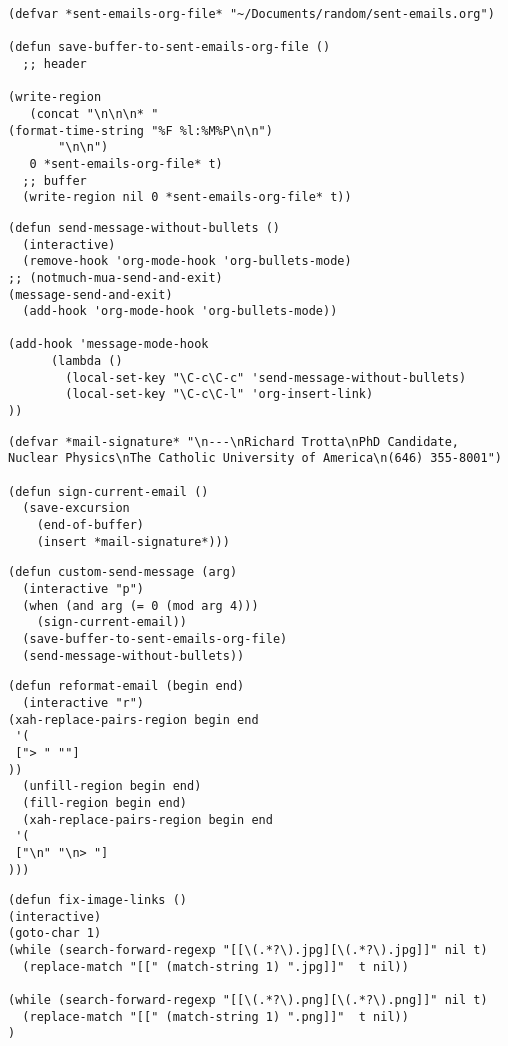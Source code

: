 \documentclass[11pt]{article}
\begin{document}
\label{sec:org41771ae}
\begin{verbatim}
(defvar *sent-emails-org-file* "~/Documents/random/sent-emails.org")

(defun save-buffer-to-sent-emails-org-file ()
  ;; header

(write-region
   (concat "\n\n\n* "
(format-time-string "%F %l:%M%P\n\n")
	   "\n\n")
   0 *sent-emails-org-file* t)
  ;; buffer
  (write-region nil 0 *sent-emails-org-file* t))
\end{verbatim}
\label{sec:orgef7c00f}
\begin{verbatim}
(defun send-message-without-bullets ()
  (interactive)
  (remove-hook 'org-mode-hook 'org-bullets-mode)
;; (notmuch-mua-send-and-exit)
(message-send-and-exit) 
  (add-hook 'org-mode-hook 'org-bullets-mode))

(add-hook 'message-mode-hook
	  (lambda ()
	    (local-set-key "\C-c\C-c" 'send-message-without-bullets)
	    (local-set-key "\C-c\C-l" 'org-insert-link)
))

\end{verbatim}
\label{sec:orgb50f745}
\begin{verbatim}
(defvar *mail-signature* "\n---\nRichard Trotta\nPhD Candidate, Nuclear Physics\nThe Catholic University of America\n(646) 355-8001")

(defun sign-current-email ()
  (save-excursion
    (end-of-buffer)
    (insert *mail-signature*)))
\end{verbatim}

\label{sec:orgf3c4121}
\begin{verbatim}
(defun custom-send-message (arg)
  (interactive "p")
  (when (and arg (= 0 (mod arg 4)))
    (sign-current-email))
  (save-buffer-to-sent-emails-org-file)
  (send-message-without-bullets))
\end{verbatim}
\label{sec:org06638fa}
\begin{verbatim}
(defun reformat-email (begin end)
  (interactive "r")
(xah-replace-pairs-region begin end
 '(
 ["> " ""]
))
  (unfill-region begin end)
  (fill-region begin end)
  (xah-replace-pairs-region begin end
 '(
 ["\n" "\n> "]
)))

\end{verbatim}
\label{sec:org025b7b9}
\begin{verbatim}
(defun fix-image-links ()
(interactive)
(goto-char 1)
(while (search-forward-regexp "[[\(.*?\).jpg][\(.*?\).jpg]]" nil t)
  (replace-match "[[" (match-string 1) ".jpg]]"  t nil))

(while (search-forward-regexp "[[\(.*?\).png][\(.*?\).png]]" nil t)
  (replace-match "[[" (match-string 1) ".png]]"  t nil))
)
\end{verbatim}
\end{document}
